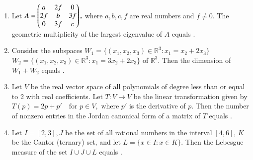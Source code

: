 \documentclass[journal,,12pt,onecolumn]{IEEEtran}
\theoremstyle{remark}
\begin{document}
\begin{enumerate}
\item Let 
$
A = \begin{pmatrix}
    a & 2f & 0 \\
    2f & b & 3f \\
    0 & 3f & c
\end{pmatrix}, 
$
where $ a, b, c, f $ are real numbers and $ f \neq 0 $. The geometric multiplicity of the largest eigenvalue of $ A $ equals \underline{\hspace{2cm}}.

\bigskip

\item Consider the subspaces 
$
W_1 = \{(x_1, x_2, x_3) \in \mathbb{R}^3 : x_1 = x_2 + 2x_3\}
$
$
W_2 = \{(x_1, x_2, x_3) \in \mathbb{R}^3 : x_1 = 3x_2 + 2x_3\}
$
of $ \mathbb{R}^3 $. Then the dimension of $ W_1 + W_2 $ equals \underline{\hspace{2cm}}.

\bigskip

\item Let $ V $ be the real vector space of all polynomials of degree less than or equal to 2 with real coefficients. Let 
$
T : V \to V
$
be the linear transformation given by 
$
T(p) = 2p + p' \quad \text{for } p \in V,
$
where $ p' $ is the derivative of $ p $. Then the number of nonzero entries in the Jordan canonical form of a matrix of $ T $ equals \underline{\hspace{2cm}}.
\bigskip


\item Let $ I = [2, 3], J $ be the set of all rational numbers in the interval $ [4, 6] $, $ K $ be the Cantor (ternary) set, and let 
$
L = \{x \in I : x \in K\}.
$
Then the Lebesgue measure of the set $ I \cup J \cup L $ equals \underline{\hspace{2cm}}.
\bigskip
\end{enumerate}
\end{document}
